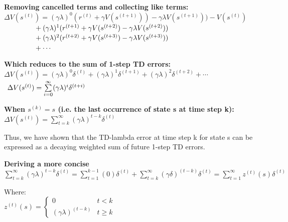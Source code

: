 \documentclass[11pt]{article}
\begin{document}
\begin{large}
    \textbf{Removing cancelled terms and collecting like terms:}\\\vspace{1mm}
    $\Delta V(s^{(t)}) = (\gamma \lambda)^0 (r^{(t)} + \gamma V(s^{(t+1)})) -  \gamma \lambda V(s^{(t+1)})) - V(s^{(t)})$\\
    $\null \hspace{15mm} + (\gamma \lambda)^1 (r^{(t+1)} + \gamma V(s^{(t+2)}) - \gamma \lambda V(s^{(t+2)}))$\\
    $\null \hspace{15mm} + (\gamma \lambda)^2 (r^{(t+2)} + \gamma V(s^{(t+3)}) - \gamma \lambda V(s^{(t+3)}))$\\
    $\null \hspace{15mm} + \cdots$
    
    \textbf{Which reduces to the sum of 1-step TD errors:}\\\vspace{1mm}
    $\Delta V(s^{(t)}) = (\gamma \lambda)^0 \delta^{(t)} + (\gamma \lambda)^1 \delta^{(t+1)} + (\gamma \lambda)^2 \delta^{(t+2)} + \cdots$\\
    $\null\;\,\Delta V(s^{(t)}) = \sum\limits_{i=0}^\infty (\gamma \lambda)^{i} \delta^{(t+i)}$
    
    \textbf{When $s^{(k)} = s$ (i.e. the last occurrence of state s at time step k):}\\\vspace{1mm}
    $\Delta V(s^{(t)}) = \sum\limits_{t=k}^\infty (\gamma \lambda)^{t-k} \delta^{(t)}$
\end{large}

Thus, we have shown that the TD-lambda error at time step k for state s can be expressed as a decaying weighted sum of future 1-step TD errors.

\begin{large}
    \textbf{Deriving a more concise }\\\vspace{1mm}
    $\sum\limits_{t=k}^\infty (\gamma \lambda)^{t-k} \delta^{(t)} = \sum\limits_{t=1}^{k-1} (0) \delta^{(t)} + \sum\limits_{t=k}^{\infty} (\gamma \delta)^{(t-k)} \delta^{(t)} = \sum\limits_{t=1}^{\infty} z^{(t)}(s) \delta^{(t)}$
    
    Where:\\
    $ z^{(t)}(s) = \begin{cases} 
      0 & t < k \\
      (\gamma \lambda)^{(t-k)} & t \geq k 
     \end{cases} $
\end{large}
\end{document}

